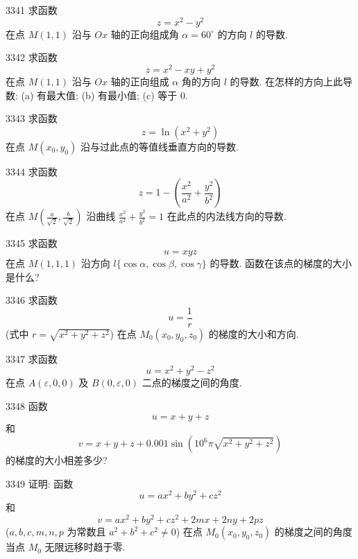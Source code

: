 \begin{prob}[M]{3341}
求函数
\[
z = x^2 - y^2
\]
在点 $M(1, 1)$ 沿与 $Ox$ 轴的正向组成角 $\alpha = 60^\circ$ 的方向 $l$ 的导数.
\end{prob}

\begin{prob}[L]{3342}
求函数
\[
z = x^2 - xy + y^2
\]
在点 $M(1, 1)$ 沿与 $Ox$ 轴的正向组成 $\alpha$ 角的方向 $l$ 的导数. 在怎样的方向上此导数: (a) 有最大值; (b) 有最小值; (c) 等于 $0$.
\end{prob}

\begin{prob}[M]{3343}
求函数
\[
z = \ln(x^2 + y^2)
\]
在点 $M(x_0, y_0)$ 沿与过此点的等值线垂直方向的导数.
\end{prob}

\begin{prob}[M]{3344}
求函数
\[
z = 1 - \left(\frac{x^2}{a^2} + \frac{y^2}{b^2}\right)
\]
在点 $M\left(\frac{a}{\sqrt{2}}, \frac{b}{\sqrt{2}}\right)$ 沿曲线 $\frac{x^2}{a^2} + \frac{y^2}{b^2} = 1$ 在此点的内法线方向的导数.
\end{prob}

\begin{prob}[M]{3345}
求函数
\[
u = xyz
\]
在点 $M(1, 1, 1)$ 沿方向 $l\{\cos\alpha, \cos\beta, \cos\gamma\}$ 的导数. 函数在该点的梯度的大小是什么?
\end{prob}

\begin{prob}[M]{3346}
求函数
\[
u = \frac{1}{r}
\]
(式中 $r = \sqrt{x^2 + y^2 + z^2}$) 在点 $M_0(x_0, y_0, z_0)$ 的梯度的大小和方向.
\end{prob}

\begin{prob}[M]{3347}
求函数
\[
u = x^2 + y^2 - z^2
\]
在点 $A(\varepsilon, 0, 0)$ 及 $B(0, \varepsilon, 0)$ 二点的梯度之间的角度.
\end{prob}

\begin{prob}[M]{3348}
函数
\[
u = x + y + z
\]
和
\[
v = x + y + z + 0.001\sin\left(10^6\pi\sqrt{x^2 + y^2 + z^2}\right)
\]
的梯度的大小相差多少?
\end{prob}

\begin{prob}[M]{3349}
证明: 函数
\[
u = ax^2 + by^2 + cz^2
\]
和
\[
v = ax^2 + by^2 + cz^2 + 2mx + 2ny + 2pz
\]
($a, b, c, m, n, p$ 为常数且 $a^2 + b^2 + c^2 \neq 0$) 在点 $M_0(x_0, y_0, z_0)$ 的梯度之间的角度当点 $M_0$ 无限远移时趋于零.
\end{prob}


